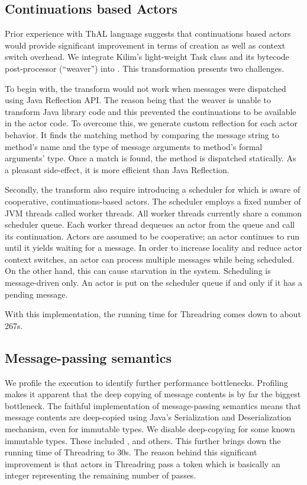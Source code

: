 \subsection{Continuations based Actors}

Prior experience with ThAL language \cite{wkim-phd} suggests that continuations based actors would provide significant improvement in terms of creation as well as context switch overhead. We integrate Kilim's light-weight Task class and its bytecode post-processor (``weaver'') into \af{}. This transformation presents two challenges.

To begin with, the transform would not work when messages were dispatched using Java Reflection API. The reason being that the weaver is unable to transform Java library code and this prevented the continuations to be available in the actor code. To overcome this, we generate custom reflection for each actor behavior. It finds the matching method by comparing the message string to method's name and the type of message arguments to method's formal arguments' type. Once a match is found, the method is dispatched statically. As a pleasant side-effect, it is more efficient than Java Reflection. 

Secondly, the transform also require introducing a scheduler for \af{} which is aware of cooperative, continuations-based actors. The scheduler employs a fixed number of JVM threads called worker threads. All worker threads currently share a common scheduler queue. Each worker thread dequeues an actor from the queue and call its continuation. Actors are assumed to be cooperative; an actor continues to run until it yields waiting for a message. In order to increase locality and reduce actor context switches, an actor can process multiple messages while being scheduled. On the other hand, this can cause starvation in the system. Scheduling is message-driven only. An actor is put on the scheduler queue if and only if it has a pending message. 

With this implementation, the running time for Threadring comes down to about 267s.

\subsection{Message-passing semantics}
\label{messaging}

We profile the execution to identify further performance bottlenecks. Profiling makes it apparent that the deep copying of message contents is by far the biggest bottleneck. The faithful implementation of message-passing semantics means that message contents are deep-copied using Java's Serialization and Deserialization mechanism, even for immutable types. We disable deep-copying for some known immutable types. These included ,  and others. This further brings down the running time of Threadring to 30s. The reason behind this significant improvement is that actors in Threadring pass a token which is basically an integer representing the remaining number of passes.


